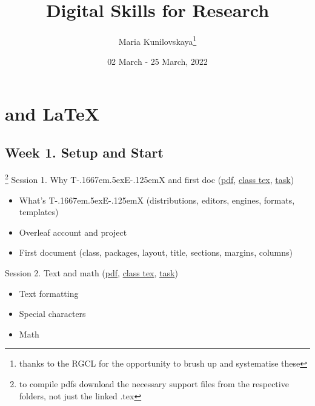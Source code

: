 \documentclass[a4paper,12pt]{article} %
\title{\vspace{-4em} Digital Skills for Research}
\author{Maria Kunilovskaya\thanks{thanks to the RGCL for the opportunity to brush up and systematise these}}
\date{02 March - 25 March, 2022}
\def\TeX{{\rm T\kern-.1667em\lower.5ex\hbox{E}\kern-.125emX }}
\begin{document}
	
\clearpage\maketitle
\thispagestyle{empty}	
\maketitle

\vspace{-2em}

\section{{\color{red}\TeX and \LaTeX}}

\subsection{Week 1. Setup and Start}\footnote{to compile pdfs download the necessary support files from the respective folders, not just the linked .tex}
	Session 1. Why \TeX and first doc (\href{https://canvas.wlv.ac.uk/courses/33429/files/folder/latex_mendeley_github/w1-3_latex?preview=4622172}{pdf}, \href{https://github.com/kunilovskaya/dskills_workshop/blob/main/w1_latex_basics/session1.tex}{class tex}, \href{https://github.com/kunilovskaya/dskills_workshop/blob/main/w1_latex_basics/task1.tex}{task})
		\begin{itemize}
			\item What's \TeX (distributions, editors, engines, formats, templates)
			\item Overleaf account and project
			\item First document (class, packages, layout, title, sections, margins, columns)
		\end{itemize} 
	Session 2. Text and math (\href{https://canvas.wlv.ac.uk/courses/33429/files/folder/latex_mendeley_github/w1-3_latex?preview=4623463}{pdf}, \href{https://github.com/kunilovskaya/dskills_workshop/blob/main/w1_latex_basics/session1.tex}{class tex}, \href{https://github.com/kunilovskaya/dskills_workshop/blob/main/w1_latex_basics/task2.pdf}{task})
		\begin{itemize}
			\item Text formatting
			\item Special characters
			\item Math
		\end{itemize}
\end{document}
